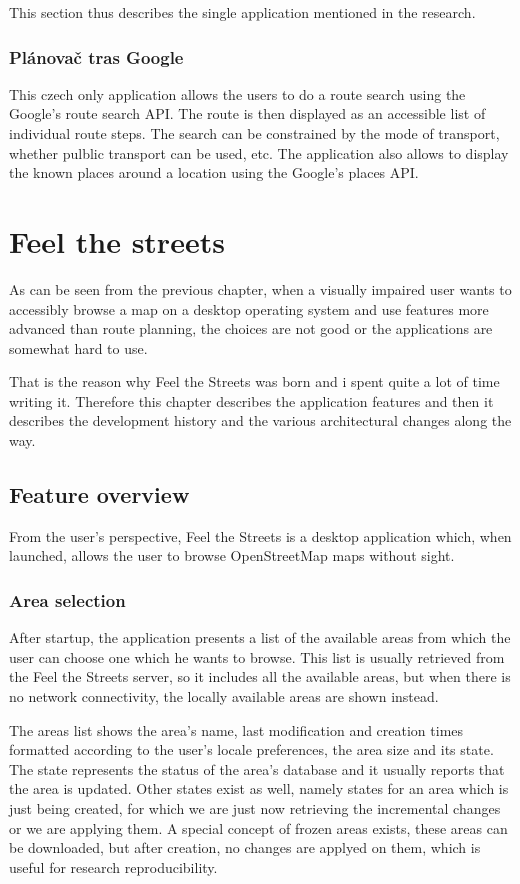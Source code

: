 \documentclass[nolof,digital]{fithesis3}
\begin{document}
This section thus describes the single application mentioned in the research.
\subsection{Plánovač tras Google}
This czech only application \parencite{ptg} allows the users to do a route search using the Google's route search API. The route is then displayed as an accessible list of individual route steps. The search can be constrained by the mode of transport, whether pulblic transport can be used, etc. The application also allows to display the known places around a location using the Google's places API.
\chapter{Feel the streets}
As can be seen from the previous chapter, when a visually impaired user wants to accessibly browse a map on a desktop operating system and use features more advanced than route planning, the choices are not good or the applications are somewhat hard to use.

That is the reason why Feel the Streets was born and i spent quite a lot of time writing it. Therefore this chapter describes the application features and then it describes the development history and the various architectural changes along the way.
\section{Feature overview}
From the user's perspective, Feel the Streets is a desktop application which, when launched, allows the user to browse OpenStreetMap maps without sight.
\subsection{Area selection}
After startup, the application presents a list of the available areas from which the user can choose one which he wants to browse. This list is usually retrieved from the Feel the Streets server, so it includes all the available areas, but when there is no network connectivity, the locally available areas are shown instead.

The areas list shows the area's name, last modification and creation times formatted according to the user's locale preferences, the area size and its state. The state represents the status of the area's database and it usually reports that the area is updated. Other states exist as well, namely states for an area which is just being created, for which we are just now retrieving the incremental changes or we are applying them. A special concept of frozen areas exists, these areas can be downloaded, but after creation, no changes are applyed on them, which is useful for research reproducibility.
\end{document}
